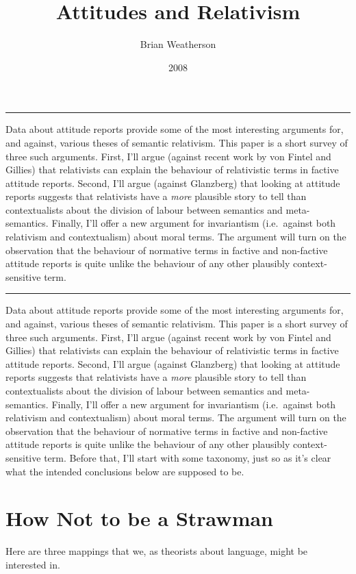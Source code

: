 \documentclass[
  10pt,
  letterpaper,
  DIV=11,
  numbers=noendperiod,
  twoside]{scrartcl}
\title{Attitudes and Relativism}
\author{Brian Weatherson}
\date{2008}
\renewenvironment{abstract}
 {\vspace{-1.25cm}
 \quotation\small\noindent\rule{\linewidth}{.5pt}\par\smallskip
 \noindent }
 {\par\noindent\rule{\linewidth}{.5pt}\endquotation}
\begin{document}
\maketitle
\begin{abstract}
Data about attitude reports provide some of the most interesting
arguments for, and against, various theses of semantic relativism. This
paper is a short survey of three such arguments. First, I'll argue
(against recent work by von Fintel and Gillies) that relativists can
explain the behaviour of relativistic terms in factive attitude reports.
Second, I'll argue (against Glanzberg) that looking at attitude reports
suggests that relativists have a \emph{more} plausible story to tell
than contextualists about the division of labour between semantics and
meta-semantics. Finally, I'll offer a new argument for invariantism
(i.e.~against both relativism and contextualism) about moral terms. The
argument will turn on the observation that the behaviour of normative
terms in factive and non-factive attitude reports is quite unlike the
behaviour of any other plausibly context-sensitive term.
\end{abstract}


Data about attitude reports provide some of the most interesting
arguments for, and against, various theses of semantic relativism. This
paper is a short survey of three such arguments. First, I'll argue
(against recent work by von Fintel and Gillies) that relativists can
explain the behaviour of relativistic terms in factive attitude reports.
Second, I'll argue (against Glanzberg) that looking at attitude reports
suggests that relativists have a \emph{more} plausible story to tell
than contextualists about the division of labour between semantics and
meta-semantics. Finally, I'll offer a new argument for invariantism
(i.e.~against both relativism and contextualism) about moral terms. The
argument will turn on the observation that the behaviour of normative
terms in factive and non-factive attitude reports is quite unlike the
behaviour of any other plausibly context-sensitive term. Before that,
I'll start with some taxonomy, just so as it's clear what the intended
conclusions below are supposed to be.

\section{How Not to be a Strawman}\label{how-not-to-be-a-strawman}

Here are three mappings that we, as theorists about language, might be
interested in.
\end{document}
